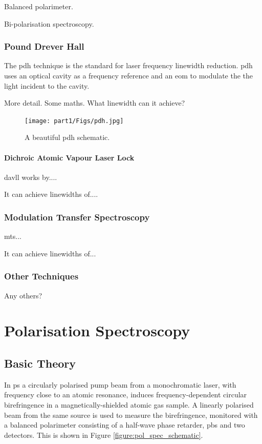 Balanced polarimeter.\cite{pearman_polarization_2002,yoshikawa_frequency_2003}

Bi-polarisation spectroscopy.\cite{tiwari_laser_2006}


\subsection{Pound Drever Hall}

The \gls{pdh} technique is the standard for laser frequency linewidth reduction.\cite{drever_laser_1983}
\gls{pdh} uses an optical cavity as a frequency reference and an \gls{eom} to modulate the the light incident to the cavity.

More detail. Some maths. What linewidth can it achieve?\cite{ludlow_compact_2007}

\begin{figure}
\centering
\texttt{[image: part1/Figs/pdh.jpg]}
\caption{A beautiful \gls{pdh} schematic.}
\end{figure}
\subsubsection{Dichroic Atomic Vapour Laser Lock}
\Gls{davll} works by....

It can achieve linewidths of....

\subsection{Modulation Transfer Spectroscopy}
\Gls{mts}...

It can achieve linewidths of...\cite{negnevitsky_wideband_2013}

\subsection{Other Techniques}

Any others?

\chapter{Polarisation Spectroscopy}\label{section:pol_spec_theory}
\section{Basic Theory}

In \gls{ps} a circularly polarised pump beam from a monochromatic laser, with frequency close to an atomic resonance, induces frequency-dependent circular birefringence in a magnetically-shielded atomic gas sample.
A linearly polarised beam from the same source is used to measure the birefringence, monitored with a balanced polarimeter consisting of a half-wave phase retarder, \gls{pbs} and two detectors.
This is shown in Figure \ref{figure:pol_spec_schematic}.


